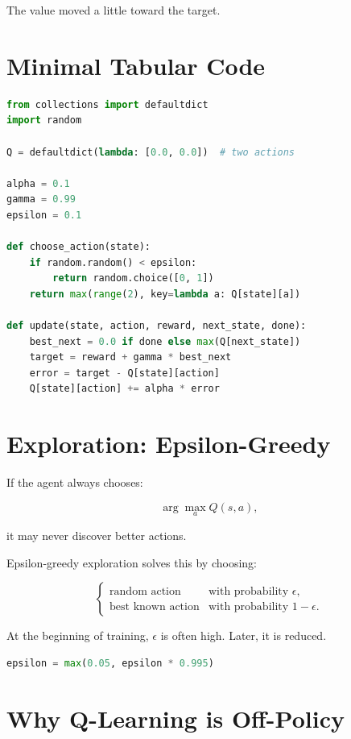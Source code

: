 \documentclass[11pt]{article}
\begin{document}
The value moved a little toward the target.

\section{Minimal Tabular Code}

\begin{lstlisting}[language=Python]
from collections import defaultdict
import random

Q = defaultdict(lambda: [0.0, 0.0])  # two actions

alpha = 0.1
gamma = 0.99
epsilon = 0.1

def choose_action(state):
    if random.random() < epsilon:
        return random.choice([0, 1])
    return max(range(2), key=lambda a: Q[state][a])

def update(state, action, reward, next_state, done):
    best_next = 0.0 if done else max(Q[next_state])
    target = reward + gamma * best_next
    error = target - Q[state][action]
    Q[state][action] += alpha * error
\end{lstlisting}

\section{Exploration: Epsilon-Greedy}

If the agent always chooses:

\[
\arg\max_a Q(s,a),
\]

it may never discover better actions.

Epsilon-greedy exploration solves this by choosing:

\[
\begin{cases}
\text{random action} & \text{with probability } \epsilon, \\
\text{best known action} & \text{with probability } 1-\epsilon.
\end{cases}
\]

At the beginning of training, $\epsilon$ is often high.
Later, it is reduced.

\begin{lstlisting}[language=Python]
epsilon = max(0.05, epsilon * 0.995)
\end{lstlisting}

\section{Why Q-Learning is Off-Policy}
\end{document}
